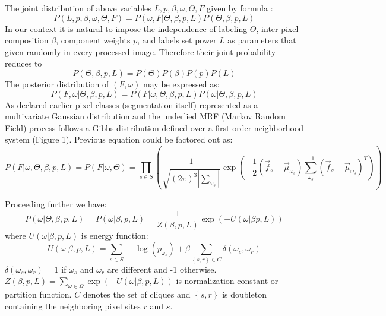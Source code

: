 \documentclass{article}
\begin{document}
The joint distribution of above variables $L,p,\beta,\omega,\Theta,F$ given by formula :
\begin{equation}
P\left(L,p,\beta,\omega,\Theta,F\right) = P\left(\omega,F\left|\Theta,\beta,p,L\right.\right)P\left(\Theta,\beta,p,L\right)
\end{equation}
In our context it is natural to impose the independence of labeling $\Theta$, inter-pixel composition $\beta$, component weights $p$, and labels set power $L$ as parameters that given randomly in every processed image. Therefore their joint probability reduces to 
\begin{equation}
P\left(\Theta,\beta,p,L\right) = P\left(\Theta\right)P\left(\beta\right)P\left(p\right)P\left(L\right)
\end{equation}
The posterior distribution of $\left(F, \omega \right)$ may be expressed as:
\begin{equation}
P\left(F,\omega\left|\right.\Theta,\beta,p,L\right)=P\left(F\left|\right.\omega,\Theta,\beta,p,L\right)P\left(\omega\left|\right.\Theta,\beta,p,L\right)
\end{equation}
As declared earlier pixel classes (segmentation itself) represented as a multivariate Gaussian distribution and the underlied MRF (Markov Random Field) process follows a Gibbs distribution defined over a first order neighborhood system (Figure 1). Previous equation could be factored out as:
\begin{equation}
P\left(F\left|\right.\omega,\Theta,\beta,p,L\right) = 
P\left(F\left|\right.\omega,\Theta\right)=

\prod_{s \in S}
\left(\frac{1}{\sqrt{\left(2\pi\right)^{3}\left|\sum_{\omega_{s}}\right|}}
\exp\left(
-\frac{1}{2}
\left(\vec{f}_{s}-\vec{\mu}_{\omega_{s}}\right)
\sum_{\omega_{s}}^{-1}
\left(\vec{f}_{s}-\vec{\mu}_{\omega_{s}}\right)^T
\right)
\right)
\end{equation}

Proceeding further we have:
\begin{equation}
P\left(\omega\left|\right.\Theta,\beta,p,L\right) = 
P\left(\omega\left|\right.\beta,p,L\right) = 
\frac {1} {Z\left(\beta,p,L\right)}
\exp\left(
-U\left(\omega\left|\right.\beta p,L\right)
\right)
\end{equation}
where $U\left(\omega\left|\right.\beta, p, L \right)$ is energy function:
\begin{equation}
U\left(\omega\left|\right.\beta, p,L\right) = 
\sum_{s\in S}-\log\left(p_{\omega_{s}}\right) +
\beta\sum_{\left\{s,r\right\}\in C}
\delta\left(\omega_{s},\omega_{r}\right)
\end{equation}
$\delta\left(\omega_{s},\omega_{r}\right) = 1$ if $\omega_{s}$ and $\omega_{r}$ are different and -1 otherwise. 
$Z\left(\beta,p,L\right) = \sum_{\omega\in \Omega}\exp\left( -U\left(\omega\left|\right.\beta,p,L\right)\right)$ is normalization constant or partition function. $C$ denotes the set of cliques and $\left\{s,r\right\}$ is doubleton containing the neighboring pixel sites $r$ and $s$.
\end{document}
